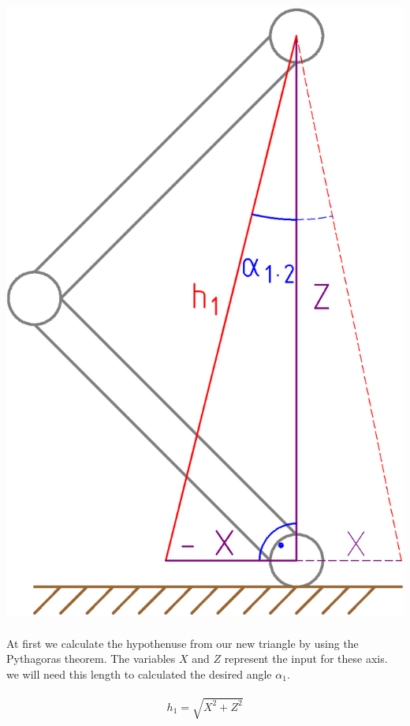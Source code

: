 \documentclass{article}
\begin{document}
    \paragraph{}
    \includegraphics[scale=0.2]{x-axis}

    \paragraph{}
    At first we calculate the hypothenuse from our new triangle by using the Pythagoras theorem. The variables $X$ and $Z$ represent the input for these axis. we will need this length to calculated the desired angle $\alpha_1$.

    \paragraph{}
    \begin{equation}
        h_1 = \sqrt{X^2 + Z^2}
    \end{equation}
\end{document}
